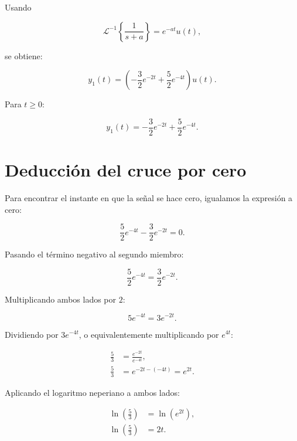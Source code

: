 \documentclass[12pt,a4paper]{article}
\begin{document}
Usando

\begin{equation}
    \mathcal{L}^{-1}\left\{\frac{1}{s+a}\right\}=e^{-at}u(t),
\end{equation}

se obtiene:

\begin{equation}
    \boxed{
    y_1(t)=\left(-\frac{3}{2}e^{-2t}+\frac{5}{2}e^{-4t}\right)u(t)
    }.
\end{equation}

Para $t\geq 0$:

\begin{equation}
    y_1(t)=-\frac{3}{2}e^{-2t}+\frac{5}{2}e^{-4t}.
\end{equation}

\section*{Deducción del cruce por cero}

Para encontrar el instante en que la señal se hace cero, igualamos la expresión a cero:

\begin{equation}
    \frac{5}{2}e^{-4t}-\frac{3}{2}e^{-2t}=0.
\end{equation}

Pasando el término negativo al segundo miembro:

\begin{equation}
    \frac{5}{2}e^{-4t}=\frac{3}{2}e^{-2t}.
\end{equation}

Multiplicando ambos lados por $2$:

\begin{equation}
    5e^{-4t}=3e^{-2t}.
\end{equation}

Dividiendo por $3e^{-4t}$, o equivalentemente multiplicando por $e^{4t}$:

\begin{align}
    \frac{5}{3}&=\frac{e^{-2t}}{e^{-4t}},\\
    \frac{5}{3}&=e^{-2t-(-4t)}=e^{2t}.
\end{align}

Aplicando el logaritmo neperiano a ambos lados:

\begin{align}
    \ln\left(\frac{5}{3}\right)&=\ln\left(e^{2t}\right),\\
    \ln\left(\frac{5}{3}\right)&=2t.
\end{align}
\end{document}
